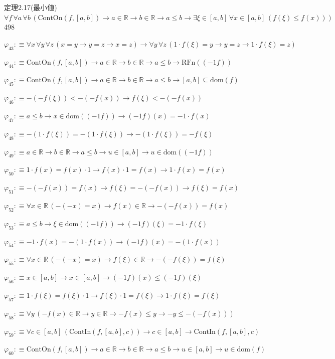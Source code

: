 \begin{fullproof}{定理2.17(最小値)}{$\forall f\,\forall a\,\forall b\,(\mathrm{ContOn}(f,[a,b]) \to a \in \mathbb{R} \to b \in \mathbb{R} \to a \leq b \to \exists \xi \in [a,b]\,\forall x \in [a,b]\,(f(\xi) \leq f(x)))$}{498}
\begin{abbrevlist}
\item $\varphi_{43} :\equiv \forall x\,\forall y\,\forall z\,(x = y \to y = z \to x = z) \to \forall y\,\forall z\,(1 \cdot f(\xi) = y \to y = z \to 1 \cdot f(\xi) = z)$
\item $\varphi_{44} :\equiv \mathrm{ContOn}(f,[a,b]) \to a \in \mathbb{R} \to b \in \mathbb{R} \to a \leq b \to \mathrm{RFn}((-1 f))$
\item $\varphi_{45} :\equiv \mathrm{ContOn}(f,[a,b]) \to a \in \mathbb{R} \to b \in \mathbb{R} \to a \leq b \to [a,b] \subseteq \mathrm{dom}(f)$
\item $\varphi_{46} :\equiv -(-f(\xi)) < -(-f(x)) \to f(\xi) < -(-f(x))$
\item $\varphi_{47} :\equiv a \leq b \to x \in \mathrm{dom}((-1 f)) \to (-1 f)(x) = -1 \cdot f(x)$
\item $\varphi_{48} :\equiv -(1 \cdot f(\xi)) = -(1 \cdot f(\xi)) \to -(1 \cdot f(\xi)) = -f(\xi)$
\item $\varphi_{49} :\equiv a \in \mathbb{R} \to b \in \mathbb{R} \to a \leq b \to u \in [a,b] \to u \in \mathrm{dom}((-1 f))$
\item $\varphi_{50} :\equiv 1 \cdot f(x) = f(x) \cdot 1 \to f(x) \cdot 1 = f(x) \to 1 \cdot f(x) = f(x)$
\item $\varphi_{51} :\equiv -(-f(x)) = f(x) \to f(\xi) = -(-f(x)) \to f(\xi) = f(x)$
\item $\varphi_{52} :\equiv \forall x \in \mathbb{R}\,(-(-x) = x) \to f(x) \in \mathbb{R} \to -(-f(x)) = f(x)$
\item $\varphi_{53} :\equiv a \leq b \to \xi \in \mathrm{dom}((-1 f)) \to (-1 f)(\xi) = -1 \cdot f(\xi)$
\item $\varphi_{54} :\equiv -1 \cdot f(x) = -(1 \cdot f(x)) \to (-1 f)(x) = -(1 \cdot f(x))$
\item $\varphi_{55} :\equiv \forall x \in \mathbb{R}\,(-(-x) = x) \to f(\xi) \in \mathbb{R} \to -(-f(\xi)) = f(\xi)$
\item $\varphi_{56} :\equiv x \in [a,b] \to x \in [a,b] \to (-1 f)(x) \leq (-1 f)(\xi)$
\item $\varphi_{57} :\equiv 1 \cdot f(\xi) = f(\xi) \cdot 1 \to f(\xi) \cdot 1 = f(\xi) \to 1 \cdot f(\xi) = f(\xi)$
\item $\varphi_{58} :\equiv \forall y\,(-f(x) \in \mathbb{R} \to y \in \mathbb{R} \to -f(x) \leq y \to -y \leq -(-f(x)))$
\item $\varphi_{59} :\equiv \forall c \in [a,b]\,(\mathrm{ContIn}(f,[a,b],c)) \to c \in [a,b] \to \mathrm{ContIn}(f,[a,b],c)$
\item $\varphi_{60} :\equiv \mathrm{ContOn}(f,[a,b]) \to a \in \mathbb{R} \to b \in \mathbb{R} \to a \leq b \to u \in [a,b] \to u \in \mathrm{dom}(f)$

\end{abbrevlist}
\end{fullproof}
